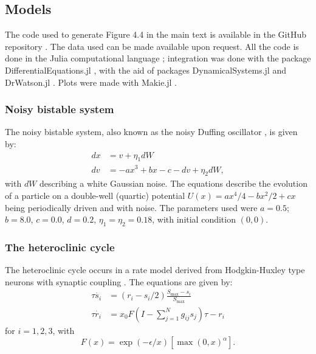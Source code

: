 \subsection*{Models}
The code used to generate Figure 4.4 in the main text is available in the GitHub repository \cite{rossi2022repository}. The data used can be made available upon request. All the code is done in the Julia computational language \cite{bezanson2017julia}; integration was done with the package DifferentialEquations.jl \cite{rackauckas2016differential}, with the aid of packages DynamicalSystems.jl \cite{datseris2018dynamical} and DrWatson.jl \cite{datseris2020drwatson}. Plots were made with Makie.jl \cite{danisch2021makie}.

\subsubsection{Noisy bistable system}
The noisy bistable system, also known as the noisy Duffing oscillator \cite{strogatz2002nonlinear}, is given by:
\begin{align}\label{eq:duffing}
    dx &= v + \eta_1 dW\\ 
    dv &= -ax^3 + bx -c -dv + \eta_2 dW,
\end{align}
with $dW$ describing a white Gaussian noise. The equations describe the evolution of a particle on a double-well (quartic) potential $U(x) = ax^4/4 -bx^2/2 +cx$ being periodically driven and with noise.
The parameters used were $a=0.5$; $b=8.0$, $c=0.0$, $d = 0.2$, $\eta_1= \eta_2 = 0.18$, with initial condition $(0, 0)$. 


\subsubsection{The heteroclinic cycle}
The heteroclinic cycle occurs in a rate model derived from Hodgkin-Huxley type neurons with synaptic coupling \cite{ashwin2011criteria}. The equations are given by:
\begin{align}
\tau\dot{s_i} &= \left( r_i - s_i/2 \right) \frac{S_\mathrm{max} - s_i}{S_\mathrm{max}} \\
\tau\dot{r_i} &= x_0 F\left( I - \sum_{j=1}^N g_{ij} s_j \right) \tau - r_i 
\end{align}
for $i = 1, 2, 3$, with 
\begin{equation}
    F(x) = \exp(-\epsilon/x) [\max(0, x)^\alpha ]. 
\end{equation}

